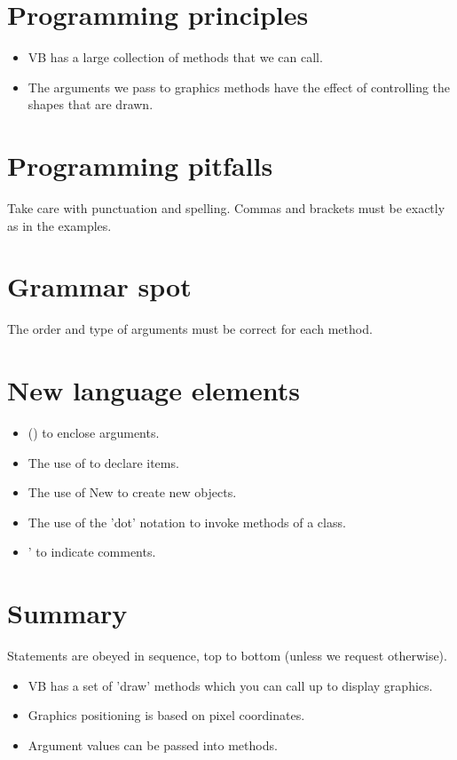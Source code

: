 	\section{Programming principles}
		\begin{itemize}
			\item VB has a large collection of methods that we can call.
			\item The arguments we pass to graphics methods have the effect of controlling the shapes that are drawn.
		\end{itemize}

	\section{Programming pitfalls}
		Take care with punctuation and spelling. Commas and brackets must be exactly as in the examples.

	\section{Grammar spot}
		The order and type of arguments must be correct for each method.

	\section{New language elements}
		\begin{itemize}
			\item () to enclose arguments.
			\item The use of  to declare items.
			\item The use of New to create new objects.
			\item The use of the 'dot' notation to invoke methods of a class.
			\item ' to indicate comments.
		\end{itemize}

	\section{Summary}
		Statements are obeyed in sequence, top to bottom (unless we request otherwise).
		\begin{itemize}
			\item VB has a set of 'draw' methods which you can call up to display graphics.
			\item Graphics positioning is based on pixel coordinates.
			\item Argument values can be passed into methods.
		\end{itemize}


